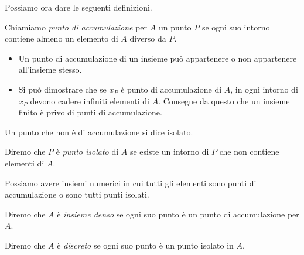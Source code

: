 Possiamo ora dare le seguenti definizioni. 

\begin{newdef}{}{}
Chiamiamo \emph{punto di accumulazione} per \(A\) un punto \(P\) se ogni 
suo intorno contiene almeno un elemento di \(A\) diverso da \(P\).
\end{newdef}

\begin{newoss}{}{}
\begin{itemize} [nosep]
\item Un punto di accumulazione di un insieme può appartenere 
o non appartenere all'insieme stesso.
\item Si può dimostrare che se \(x_P\) è punto di 
accumulazione di \(A\), in ogni intorno di \(x_P\) devono cadere infiniti 
elementi di \(A\). Consegue da questo che un insieme finito è privo di punti 
di accumulazione.
\end{itemize}
\end{newoss}

Un punto che non è di accumulazione si dice isolato.
% 

\begin{newdef}{}{}
Diremo che \(P\) è \emph{punto isolato} di \(A\) se esiste un intorno 
di \(P\) che non contiene elementi di \(A\).
\end{newdef}

Possiamo avere insiemi numerici in cui tutti gli elementi sono punti di 
accumulazione o sono tutti punti isolati.

\begin{newdef}{}{}
Diremo che \(A\) è \emph{insieme denso} se ogni suo punto è un punto di 
accumulazione per \(A\).
\end{newdef}

\begin{newdef}{}{}
Diremo che \(A\) è \emph{discreto} se ogni suo punto è un punto isolato in 
\(A\).
\end{newdef}

